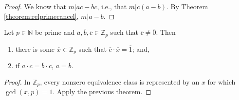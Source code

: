 \documentclass[english,course]{lecture}
\newenvironment{facnote}{\startfacnote}{}
\def\startfacnote#1\end{\margintext{{\sc Note:} #1}\end}
\theoremstyle{plain}
\def\Z{{\mathbb Z}}
\def\N{{\mathbb N}}
\def\presnotes{}
\begin{document}
\begin{proof}
	We know that $m|ac-bc$, i.e., that $m|c(a-b)$.
	By Theorem \ref{theorem:relprimecancel}, $m|a-b$.
\end{proof}

\presnotes


\begin{comment}
\begin{theorem}
	Let $p\in \N$ be prime and let $a,b,c\in \Z$ such that $p\nmid c$.
	If $ac\equiv_m bc $, then $a\equiv_m b$.
\end{theorem}

\begin{proof}
	If $p\nmid c$, then $\gcd(c,p) = 1$.
	Now apply the previous theorem.
\end{proof}
\end{comment}

\begin{theorem}\label{theorem:cancelinZp}
	Let $p\in \N$ be prime and $\overline{a},\overline{b},\overline{c}\in \Z_p$ such that $\overline{c}\ne \overline{0}$.
	Then 
	\begin{enumerate}
		\item there is some $\overline{x}\in \Z_p$ such that $\overline{c}\cdot \overline{x} = \overline{1}$; and,
		\item if $\overline{a} \cdot\overline{c} = \overline{b}\cdot\overline{c}$, $\overline{a} = \overline{b}$.
	\end{enumerate}
	
\end{theorem}

\begin{proof}
	In $\Z_p$, every nonzero equivalence class is represented by an $x$ for which $\gcd(x,p) = 1$.
	Apply the previous theorem.
\end{proof}

\presnotes




\clearpage
\end{document}
